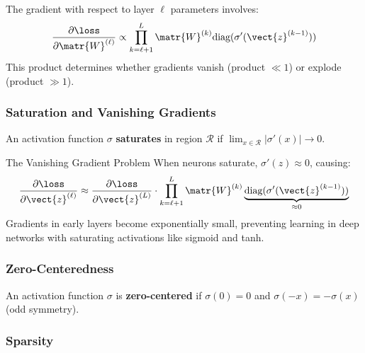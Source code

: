 \begin{theorem}
The gradient with respect to layer $\ell$ parameters involves:
\begin{equation}
\frac{\partial \loss}{\partial \matr{W}^{(\ell)}} \propto \prod_{k=\ell+1}^{L} \matr{W}^{(k)} \text{diag}(\sigma'(\vect{z}^{(k-1)}))
\end{equation}
This product determines whether gradients vanish (product $\ll 1$) or explode (product $\gg 1$).
\end{theorem}

\subsubsection{Saturation and Vanishing Gradients}

\begin{definition}
An activation function $\sigma$ \textbf{saturates} in region $\mathcal{R}$ if $\lim_{x \in \mathcal{R}} |\sigma'(x)| \to 0$.
\end{definition}

\begin{calloutbox}{The Vanishing Gradient Problem}
When neurons saturate, $\sigma'(z) \approx 0$, causing:
\begin{equation}
\frac{\partial \loss}{\partial \vect{z}^{(\ell)}} \approx \frac{\partial \loss}{\partial \vect{z}^{(L)}} \cdot \prod_{k=\ell+1}^{L} \matr{W}^{(k)} \underbrace{\text{diag}(\sigma'(\vect{z}^{(k-1)}))}_{\approx 0}
\end{equation}
Gradients in early layers become exponentially small, preventing learning in deep networks with saturating activations like sigmoid and tanh.
\end{calloutbox}

\subsubsection{Zero-Centeredness}

\begin{definition}
An activation function $\sigma$ is \textbf{zero-centered} if $\sigma(0) = 0$ and $\sigma(-x) = -\sigma(x)$ (odd symmetry).
\end{definition}



\subsubsection{Sparsity}

